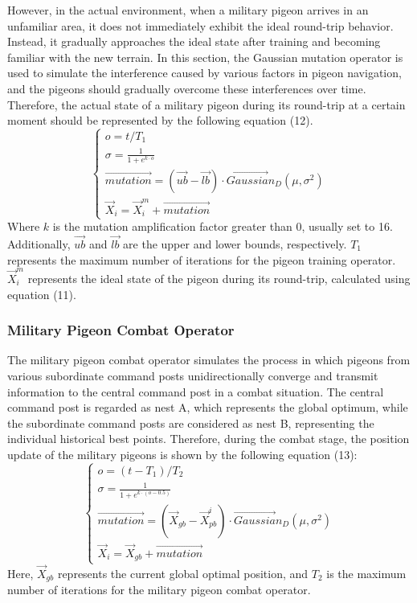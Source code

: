 \documentclass[preprint,review,compress,12pt]{elsarticle}
\begin{document}
However, in the actual environment, when a military pigeon arrives in an unfamiliar area, it does not immediately exhibit the ideal round-trip behavior. Instead, it gradually approaches the ideal state after training and becoming familiar with the new terrain. In this section, the Gaussian mutation operator is used to simulate the interference caused by various factors in pigeon navigation, and the pigeons should gradually overcome these interferences over time. Therefore, the actual state of a military pigeon during its round-trip at a certain moment should be represented by the following equation (12).
\begin{equation}
    \left\{ {\begin{array}{ccccccccccccccc}{o = t/{T_1}}\\{\sigma  = \frac{1}{{1 + {e^{k \cdot o}}}}}\\{\vec{mutation} = (\vec{ub} - \vec{lb}) \cdot \vec{Gaussia}{n_D}(\mu ,{\sigma ^2})}\\{{\vec{X}_i} = \vec{X}_i^m + \vec{mutation}}\end{array}} \right.
\end{equation}
Where $k$ is the mutation amplification factor greater than 0, usually set to 16. Additionally, $\vec{ub}$ and $\vec{lb}$ are the upper and lower bounds, respectively. $T_1$ represents the maximum number of iterations for the pigeon training operator. $\vec{X}_i^m$ represents the ideal state of the pigeon during its round-trip, calculated using equation (11).

\subsubsection{Military Pigeon Combat Operator}

The military pigeon combat operator simulates the process in which pigeons from various subordinate command posts unidirectionally converge and transmit information to the central command post in a combat situation. The central command post is regarded as nest A, which represents the global optimum, while the subordinate command posts are considered as nest B, representing the individual historical best points. Therefore, during the combat stage, the position update of the military pigeons is shown by the following equation (13): 
\begin{equation}
    \left\{ {\begin{array}{ccccccccccccccc}{o = (t - {T_1})/{T_2}}\\{\sigma  = \frac{1}{{1 + {e^{k \cdot (o - 0.5)}}}}}\\{\vec{mutation} = ({\vec{X}_{gb}} - \vec{X}_{pb}^i) \cdot \vec{Gaussia}{n_D}(\mu ,{\sigma ^2})}\\{{\vec{X}_i} = {\vec{X}_{gb}} + \vec{mutation}}\end{array}} \right.
\end{equation}
Here, $\vec{X}_{gb}$ represents the current global optimal position, and $T_2$ is the maximum number of iterations for the military pigeon combat operator.
\end{document}

